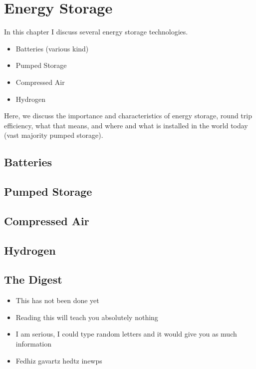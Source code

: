 \setchapterpreamble[u]{\margintoc}
\chapter{Energy Storage}

In this chapter I discuss several energy storage technologies.

\begin{itemize}
\item Batteries (various kind)
\item Pumped Storage
\item Compressed Air
\item Hydrogen
\end{itemize}

Here, we discuss the importance and characteristics of energy storage, round trip efficiency, what that means, and where and what is installed in the world today (vast majority pumped storage).

\blindtext

\section{Batteries}

\blindtext

\section{Pumped Storage}

\blindtext

\section{Compressed Air}

\blindtext

\section{Hydrogen}

\blindtext


\section{The Digest}


\begin{kaoboxgreen}[frametitle=Main Takeaways]

\begin{itemize}
\item This has not been done yet
\item Reading this will teach you absolutely nothing
\item I am serious, I could type random letters and it would give you as much information
\item Fedhiz gavartz hedtz inewps
\end{itemize}
  
\end{kaoboxgreen}